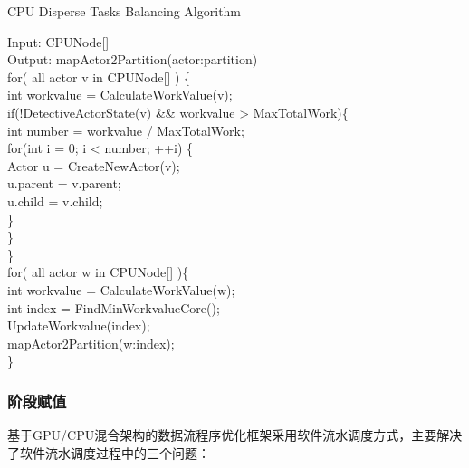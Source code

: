 \begin{algorithm}
  \caption{CPU Disperse Tasks Balancing Algorithm}
  \label{algo:cpureflect}
  Input: CPUNode[]\\
  Output: mapActor2Partition(actor:partition)\\
  for( all actor v in CPUNode[] ) \{\\
    \hspace*{1 pc} int workvalue = CalculateWorkValue(v);\\
    \hspace*{1 pc} if(!DetectiveActorState(v) \&\& workvalue > MaxTotalWork)\{\\
    \hspace*{2 pc} int number = workvalue / MaxTotalWork;\\
    \hspace*{2 pc} for(int i = 0; i < number; ++i) \{\\
    \hspace*{3 pc} Actor u = CreateNewActor(v);\\
    \hspace*{3 pc} u.parent = v.parent;\\
    \hspace*{3 pc} u.child = v.child;\\
    \hspace*{2 pc} \}\\
    \hspace*{1 pc} \}\\
  \}\\
  for( all actor w in CPUNode[] )\{\\
    \hspace*{1 pc} int workvalue = CalculateWorkValue(w);\\
    \hspace*{1 pc} int index = FindMinWorkvalueCore();\\
    \hspace*{1 pc} UpdateWorkvalue(index);\\
    \hspace*{1 pc} mapActor2Partition(w:index);\\
  \}
  \end{algorithm}

\subsubsection{阶段赋值}
基于GPU/CPU混合架构的数据流程序优化框架采用软件流水调度方式，主要解决了软件流水调度过程中的三个问题：

